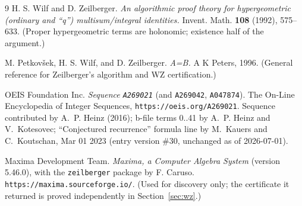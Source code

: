 \documentclass[11pt]{article}
\theoremstyle{plain}
\theoremstyle{definition}
\theoremstyle{remark}
\newcommand{\OEIS}[1]{\texttt{#1}}
\begin{document}
\begin{thebibliography}{9}
 H. S. Wilf and D. Zeilberger.
\emph{An algorithmic proof theory for hypergeometric (ordinary and ``q'') multisum/integral
identities.} Invent. Math. \textbf{108} (1992), 575--633.
(Proper hypergeometric terms are holonomic; existence half of the argument.)

 M. Petkov\v{s}ek, H. S. Wilf, and D. Zeilberger.
\emph{A=B.} A K Peters, 1996. (General reference for Zeilberger's algorithm and WZ certification.)

 OEIS Foundation Inc.
\emph{Sequence \OEIS{A269021}} (and \OEIS{A269042}, \OEIS{A047874}).
The On-Line Encyclopedia of Integer Sequences, \texttt{https://oeis.org/A269021}.
Sequence contributed by A.~P. Heinz (2016); b-file terms 0..41 by A.~P. Heinz and V.~Kotesovec;
``Conjectured recurrence'' formula line by M.~Kauers and C.~Koutschan, Mar 01 2023 (entry
version \#30, unchanged as of 2026-07-01).

 Maxima Development Team.
\emph{Maxima, a Computer Algebra System} (version 5.46.0), with the \texttt{zeilberger}
package by F. Caruso. \texttt{https://maxima.sourceforge.io/}. (Used for discovery only;
the certificate it returned is proved independently in Section~\ref{sec:wz}.)

\end{thebibliography}
\end{document}

